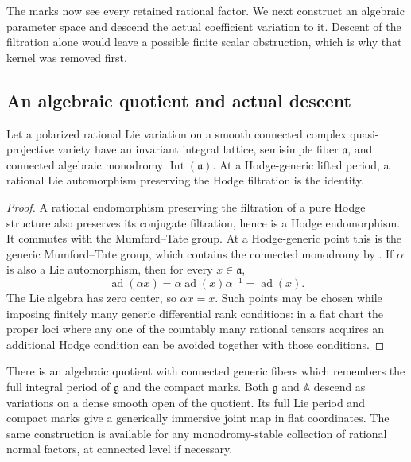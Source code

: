 The marks now see every retained rational factor. We next construct an
algebraic parameter space and descend the actual coefficient variation
to it. Descent of the filtration alone would leave a possible finite
scalar obstruction, which is why that kernel was removed first.

\subsection{An algebraic quotient and actual descent}

\begin{lemma}\label{lem:generic-lie-stabilizer}
Let a polarized rational Lie variation on a smooth connected complex
quasi-projective variety have an invariant integral lattice, semisimple
fiber $\mathfrak a$, and connected algebraic monodromy
$\operatorname{Int}(\mathfrak a)$.  At a Hodge-generic lifted
period, a rational Lie automorphism preserving the Hodge
filtration is the identity.
\end{lemma}

\begin{proof}
A rational endomorphism preserving the filtration of a pure Hodge
structure also preserves its conjugate filtration, hence is a
Hodge endomorphism.  It commutes with the Mumford--Tate group.
At a Hodge-generic point this is the generic Mumford--Tate group,
which contains the connected monodromy by
\cite[\S5, Theorem~1]{Andre92}.  If $\alpha$ is also a Lie
automorphism, then for every $x\in\mathfrak a$,
\[
 \operatorname{ad}(\alpha x)
   =\alpha\operatorname{ad}(x)\alpha^{-1}
   =\operatorname{ad}(x).
\]
The Lie algebra has zero center, so $\alpha x=x$.  Such points
may be chosen while imposing finitely many generic differential
rank conditions: in a flat chart the proper loci where any one
of the countably many rational tensors acquires an additional
Hodge condition can be avoided together with those conditions.
\end{proof}

\begin{lemma}\label{lem:period-descent}
There is an algebraic quotient with connected generic fibers
which remembers the full integral period of $\mathfrak g$ and
the compact marks.  Both $\mathfrak g$ and $\mathbb A$ descend
as variations on a dense smooth open of the quotient.  Its full
Lie period and compact marks give a generically immersive joint
map in flat coordinates.  The same construction is available for
any monodromy-stable collection of rational normal factors, at
connected level if necessary.
\end{lemma}

